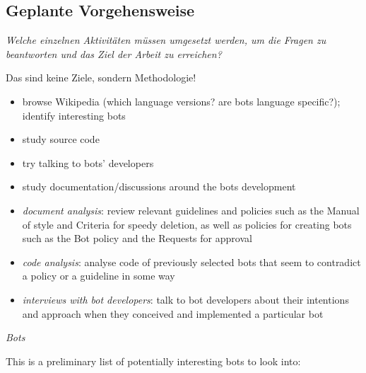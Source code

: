 \documentclass[pdftex,a4paper,11pt]{scrartcl}
\begin{document}
\subsection{Geplante Vorgehensweise}
\noindent \emph{Welche einzelnen Aktivitäten müssen umgesetzt werden, um die Fragen zu beantworten und das Ziel der Arbeit zu erreichen?}
\begin{comment}
\begin{itemize}
	\item Aus den Fragen (vorheriger Abschnitt) können Sie dann Aktivitäten ableiten, die Ihnen helfen, Ihre weitere Arbeit zu strukturieren.
\end{itemize}
\end{comment}

Das sind keine Ziele, sondern Methodologie!
\begin{itemize}
  \item browse Wikipedia (which language versions? are bots language specific?); identify interesting bots
  \item study source code
  \item try talking to bots' developers
  \item study documentation/discussions around the bots development
\end{itemize}

\begin{itemize}
  \item \emph{document analysis}: review relevant guidelines and policies such as the Manual of style and Criteria for speedy deletion, as well as policies for creating bots such as the Bot policy and the Requests for approval
  \item \emph{code analysis}: analyse code of previously selected bots that seem to contradict a policy or a guideline in some way
  \item \emph{interviews with bot developers}: talk to bot developers about their intentions and approach when they conceived and implemented a particular bot
\end{itemize}

\emph{Bots}

This is a preliminary list of potentially interesting bots to look into:
\end{document}
